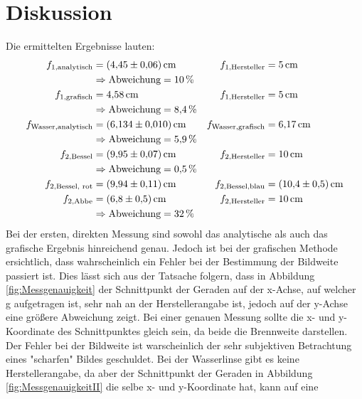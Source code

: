 \section{Diskussion}
\label{sec:Diskussion}
Die ermittelten Ergebnisse lauten:
\begin{align*}
  f_\text{1,analytisch} &=  \SI{4.45\pm0.06}{\centi\metre} &   f_\text{1,Hersteller} &= \SI{5}{\centi\metre} \\
  & \Rightarrow \text{Abweichung} = \SI{10}{\percent} \\
  f_\text{1,grafisch} &=  \SI{4.58}{\centi\metre} &   f_\text{1,Hersteller} &= \SI{5}{\centi\metre} \\
  & \Rightarrow \text{Abweichung} = \SI{8.4}{\percent} \\
  f_\text{Wasser,analytisch} &=  \SI{6.134\pm0.01}{\centi\metre} &  f_\text{Wasser,grafisch} &=  \SI{6.17}{\centi\metre} \\
  & \Rightarrow \text{Abweichung} = \SI{5.9}{\percent} \\
  f_\text{2,Bessel} &=  \SI{9.95\pm0.07}{\centi\metre} &  f_\text{2,Hersteller} &=  \SI{10}{\centi\metre} \\
  & \Rightarrow \text{Abweichung} = \SI{0.5}{\percent} \\
  f_\text{2,Bessel, rot} &=  \SI{9.94\pm0.11}{\centi\metre} &  f_\text{2,Bessel,blau} &= \SI{10.4\pm0.5}{\centi\metre} \\
  f_\text{2,Abbe} &=  \SI{6.8\pm0.5}{\centi\metre} &  f_\text{2,Hersteller} &=  \SI{10}{\centi\metre} \\
  & \Rightarrow \text{Abweichung} = \SI{32}{\percent} \\
\end{align*}
Bei der ersten, direkten Messung sind sowohl das analytische als auch das grafische Ergebnis hinreichend genau. Jedoch ist bei der grafischen Methode ersichtlich,
dass wahrscheinlich ein Fehler bei der Bestimmung der Bildweite passiert ist. Dies lässt sich aus der Tatsache folgern, dass in Abbildung \ref{fig:Messgenauigkeit} der Schnittpunkt
der Geraden auf der x-Achse, auf welcher g aufgetragen ist, sehr nah an der Herstellerangabe ist, jedoch auf der y-Achse eine größere Abweichung zeigt. Bei einer
genauen Messung sollte die x- und y-Koordinate des Schnittpunktes gleich sein, da beide die Brennweite darstellen.
Der Fehler bei der Bildweite ist warscheinlich der sehr subjektiven Betrachtung eines "scharfen" Bildes geschuldet.
Bei der Wasserlinse gibt es keine Herstellerangabe, da aber der Schnittpunkt der Geraden in Abbildung \ref{fig:MessgenauigkeitII} die selbe x- und y-Koordinate hat, kann auf eine
